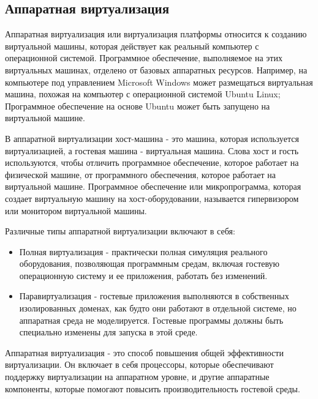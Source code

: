 \subsection{Аппаратная виртуализация}\label{sec:hard_virt}
Аппаратная виртуализация или виртуализация платформы относится к созданию виртуальной машины, которая действует как реальный компьютер с операционной системой. Программное обеспечение, выполняемое на этих виртуальных машинах, отделено от базовых аппаратных ресурсов. Например, на компьютере под управлением Microsoft Windows может размещаться виртуальная машина, похожая на компьютер с операционной системой Ubuntu Linux; Программное обеспечение на основе Ubuntu может быть запущено на виртуальной машине.


В аппаратной виртуализации хост-машина - это машина, которая используется виртуализацией, а гостевая машина - виртуальная машина. Слова хост и гость используются, чтобы отличить программное обеспечение, которое работает на физической машине, от программного обеспечения, которое работает на виртуальной машине. Программное обеспечение или микропрограмма, которая создает виртуальную машину на хост-оборудовании, называется гипервизором или монитором виртуальной машины.


Различные типы аппаратной виртуализации включают в себя:

\begin{itemize}
  \item Полная виртуализация - практически полная симуляция реального оборудования, позволяющая программным средам, включая гостевую операционную систему и ее приложения, работать без изменений.
  \item Паравиртуализация - гостевые приложения выполняются в собственных изолированных доменах, как будто они работают в отдельной системе, но аппаратная среда не моделируется. Гостевые программы должны быть специально изменены для запуска в этой среде.
\end{itemize}

Аппаратная виртуализация - это способ повышения общей эффективности виртуализации. Он включает в себя процессоры, которые обеспечивают поддержку виртуализации на аппаратном уровне, и другие аппаратные компоненты, которые помогают повысить производительность гостевой среды.


